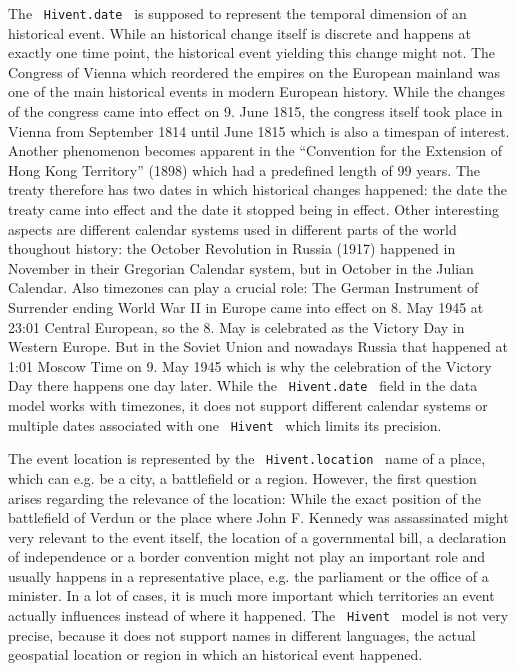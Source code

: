 The ~\texttt{Hivent.date}~ is supposed to represent the temporal dimension of an historical event. While an historical change itself is discrete and happens at exactly one time point, the historical event yielding this change might not. The Congress of Vienna which reordered the empires on the European mainland was one of the main historical events in modern European history. While the changes of the congress came into effect on 9. June 1815, the congress itself took place in Vienna from September 1814 until June 1815 which is also a timespan of interest. Another phenomenon becomes apparent in the ``Convention for the Extension of Hong Kong Territory'' (1898) which had a predefined length of 99 years. The treaty therefore has two dates in which historical changes happened: the date the treaty came into effect and the date it stopped being in effect. Other interesting aspects are different calendar systems used in different parts of the world thoughout history: the October Revolution in Russia (1917) happened in November in their Gregorian Calendar system, but in October in the Julian Calendar. Also timezones can play a crucial role: The German Instrument of Surrender ending World War II in Europe came into effect on 8. May 1945 at 23:01 Central European, so the 8. May is celebrated as the Victory Day in Western Europe. But in the Soviet Union and nowadays Russia that happened at 1:01 Moscow Time on 9. May 1945 which is why the celebration of the Victory Day there happens one day later. While the ~\texttt{Hivent.date}~ field in the data model works with timezones, it does not support different calendar systems or multiple dates associated with one ~\texttt{Hivent}~ which limits its precision.

The event location is represented by the ~\texttt{Hivent.location}~ name of a place, which can e.g. be a city, a battlefield or a region. However, the first question arises regarding the relevance of the location: While the exact position of the battlefield of Verdun or the place where John F. Kennedy was assassinated might very relevant to the event itself, the location of a governmental bill, a declaration of independence or a border convention might not play an important role and usually happens in a representative place, e.g. the parliament or the office of a minister. In a lot of cases, it is much more important which territories an event actually influences instead of where it happened. The ~\texttt{Hivent}~ model is not very precise, because it does not support names in different languages, the actual geospatial location or region in which an historical event happened.

